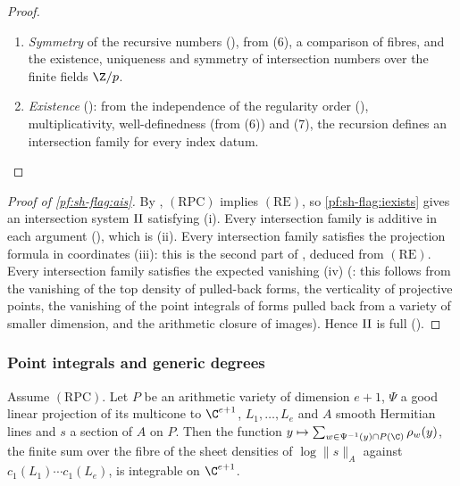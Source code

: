 \begin{proof}
\begin{enumerate}[label=(\arabic*)]
): the recursion may be applied to two lines in either order,
from (5), the cycle relations and a cut of geometric numbers.
\item \emph{Symmetry} of the recursive numbers (), from (6), a
comparison of fibres, and the existence, uniqueness and symmetry of intersection numbers over the finite fields $\Z/p$.
\item \emph{Existence} (): from the independence of the regularity
order (), multiplicativity, well-definedness (from (6)) and (7),
the recursion defines an intersection family for every index datum.\qedhere
\end{enumerate}
\end{proof}

\begin{proof}[Proof of \cref{pf:sh-flag:ais}]
By , $(\mathrm{RPC})$ implies $(\mathrm{RE})$, so
\cref{pf:sh-flag:iexists} gives an intersection system $\mathrm{II}$ satisfying (i). Every intersection family is additive in each
argument (), which is (ii). Every intersection
family satisfies the projection formula in coordinates (iii): this is the second part of
, deduced from $(\mathrm{RE})$. Every intersection family satisfies the
expected vanishing (iv) (: this follows from the vanishing of the
top density of pulled-back forms, the verticality of projective points, the vanishing of the point integrals of forms pulled back
from a variety of smaller dimension, and the arithmetic closure of images). Hence $\mathrm{II}$ is full
().
\end{proof}

\subsubsection{Point integrals and generic degrees}

\begin{proposition}\label{pf:sh-flag:ptsint}
Assume $(\mathrm{RPC})$. Let $P$ be an arithmetic variety of dimension $e+1$, $\Psi$ a good linear projection of its multicone to
$\C^{e+1}$, $L_1,\dots,L_e$ and $A$ smooth Hermitian lines and $s$ a section of $A$ on $P$. Then the function
$y\mapsto\sum_{w\in\Psi^{-1}(y)\cap P(\C)}\rho_w(y)$, the finite sum over the fibre of the sheet densities of $\log\|s\|_A$ against
$c_1(L_1)\cdots c_1(L_e)$, is integrable on $\C^{e+1}$.
\end{proposition}

